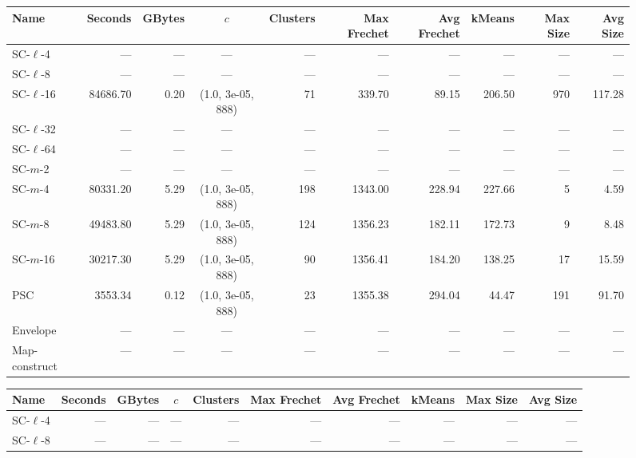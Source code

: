 \begin{figure} \begin{center}
    \begin{minipage}{\textwidth}
    {
    \begin{tabular}{@{}lrrcrrrrrr@{}}
        \toprule
        Name & Seconds & GBytes & $c$ & Clusters & Max Frechet & Avg Frechet & kMeans & Max Size & Avg Size\\
        \midrule
        SC-$\ell$-4 & --- & --- & --- & --- & --- & --- & --- & --- & ---\\
        SC-$\ell$-8 & --- & --- & --- & --- & --- & --- & --- & --- & ---\\
        SC-$\ell$-16 & 84686.70 & 0.20 & (1.0, 3e-05, 888) & 71 & 339.70 & 89.15 & 206.50 & 970 & 117.28\\
        SC-$\ell$-32 & --- & --- & --- & --- & --- & --- & --- & --- & ---\\
        SC-$\ell$-64 & --- & --- & --- & --- & --- & --- & --- & --- & ---\\
        SC-$m$-2 & --- & --- & --- & --- & --- & --- & --- & --- & ---\\
        SC-$m$-4 & 80331.20 & 5.29 & (1.0, 3e-05, 888) & 198 & 1343.00 & 228.94 & 227.66 & 5 & 4.59\\
        SC-$m$-8 & 49483.80 & 5.29 & (1.0, 3e-05, 888) & 124 & 1356.23 & 182.11 & 172.73 & 9 & 8.48\\
        SC-$m$-16 & 30217.30 & 5.29 & (1.0, 3e-05, 888) & 90 & 1356.41 & 184.20 & 138.25 & 17 & 15.59\\
        PSC & 3553.34 & 0.12 & (1.0, 3e-05, 888) & 23 & 1355.38 & 294.04 & 44.47 & 191 & 91.70\\
        Envelope & --- & --- & --- & --- & --- & --- & --- & --- & ---\\
        Map-construct & --- & --- & --- & --- & --- & --- & --- & --- & ---\\
        \bottomrule
    \end{tabular}
    }
    {
    \begin{tabular}{@{}lrrcrrrrrr@{}}
        \toprule
        Name & Seconds & GBytes & $c$ & Clusters & Max Frechet & Avg Frechet & kMeans & Max Size & Avg Size\\
        \midrule
        SC-$\ell$-4 & --- & --- & --- & --- & --- & --- & --- & --- & ---\\
        SC-$\ell$-8 & --- & --- & --- & --- & --- & --- & --- & --- & ---\\

\end{tabular}}
\end{minipage}
\end{center}
\end{figure}
